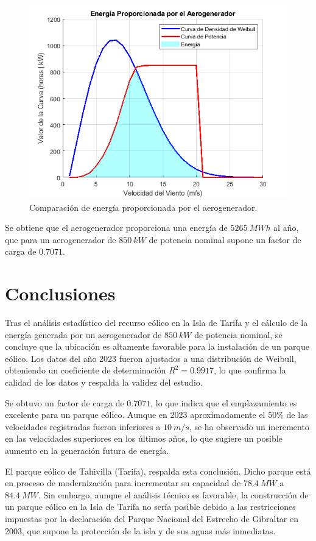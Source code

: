 \documentclass{IEEEtran}
\begin{document}
\begin{figure}[h]
    \centering
    \includegraphics[width = 0.5 \textwidth]{Imagenes/Curva de Energia.png}
    \caption{Comparación de energía proporcionada por el aerogenerador.}
    \label{fig: Curva de energia proporcionada por el aerogenerador}
\end{figure}

Se obtiene que el aerogenerador proporciona una energía de $5265\ MWh$ al año, que para un aerogenerador de $850\ kW$ de potencia nominal supone un factor de carga de $0.7071$.


\section{Conclusiones}

Tras el análisis estadístico del recurso eólico en la Isla de Tarifa y el cálculo de la energía generada por un aerogenerador de $850\ kW$ de potencia nominal, se concluye que la ubicación es altamente favorable para la instalación de un parque eólico. Los datos del año 2023 fueron ajustados a una distribución de Weibull, obteniendo un coeficiente de determinación $R^2 = 0.9917$, lo que confirma la calidad de los datos y respalda la validez del estudio.

Se obtuvo un factor de carga de $0.7071$, lo que indica que el emplazamiento es excelente para un parque eólico. Aunque en 2023 aproximadamente el $50\%$ de las velocidades registradas fueron inferiores a $10\ m/s$, se ha observado un incremento en las velocidades superiores en los últimos años, lo que sugiere un posible aumento en la generación futura de energía.

El parque eólico de Tahivilla (Tarifa), respalda esta conclusión. Dicho parque está en proceso de modernización para incrementar su capacidad de $78.4\ MW$ a $84.4\ MW$. Sin embargo, aunque el análisis técnico es favorable, la construcción de un parque eólico en la Isla de Tarifa no sería posible debido a las restricciones impuestas por la declaración del Parque Nacional del Estrecho de Gibraltar en 2003, que supone la protección de la isla y de sus aguas más inmediatas.
\end{document}
